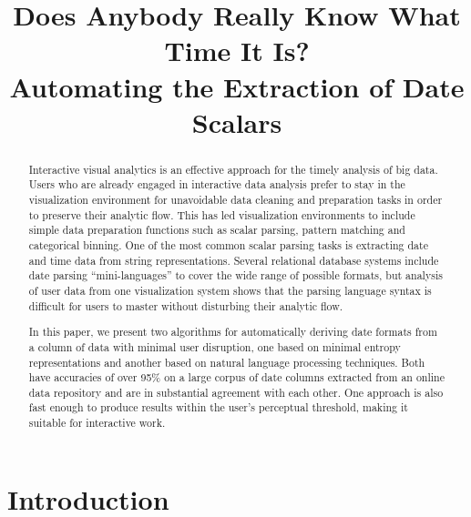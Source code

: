 \documentclass{sig-alternate-05-2015}
\newcommand{\vidya}[1]{\textcolor{red}{(vidya: #1)}}
\begin{document}
\title{Does Anybody Really Know What Time It Is?\\
Automating the Extraction of Date Scalars}


\maketitle
\begin{abstract}
Interactive visual analytics is an effective approach for the timely analysis of big data. Users who are already engaged in interactive data analysis prefer to stay in the visualization environment for unavoidable data cleaning and preparation tasks in order to preserve their analytic flow. This has led visualization environments to include simple data preparation functions such as scalar parsing, pattern matching and categorical binning. One of the most common scalar parsing tasks is extracting date and time data from string representations. Several relational database systems include date parsing ``mini-languages'' to cover the wide range of possible formats, but analysis of user data from one visualization system shows that the parsing language syntax is difficult for users to master without disturbing their analytic flow.

In this paper, we present two algorithms for automatically deriving date formats from a column of data with minimal user disruption, one based on minimal entropy representations and another based on natural language processing techniques. Both have accuracies of over 95\% on a large corpus of date columns extracted from an online data repository and are in substantial agreement with each other. One approach is also fast enough to produce results within the user's perceptual threshold, making it suitable for interactive work.
\end{abstract}



\section{Introduction}

\end{document}
